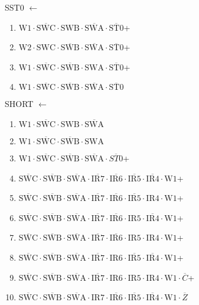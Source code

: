 \documentclass[UTF8]{ctexart}
\begin{document}
\noindent SST0 $\leftarrow$
\begin{enumerate}[\indent\indent]
	\item $\text{W1} \cdot \overline{\text{SWC}} \cdot \text{SWB} \cdot \overline{\text{SWA}} \cdot \overline{\text{ST0}}$+
	\item $\text{W2} \cdot \text{SWC} \cdot \overline{\text{SWB}} \cdot \overline{\text{SWA}} \cdot \overline{\text{ST0}}$+
	\item $\text{W1} \cdot \overline{\text{SWC}} \cdot \overline{\text{SWB}} \cdot \text{SWA} \cdot \overline{\text{ST0}}$+
	\item $\text{W1} \cdot \overline{\text{SWC}} \cdot \overline{\text{SWB}} \cdot \overline{\text{SWA}} \cdot \overline{\text{ST0}}$
\end{enumerate}
\noindent SHORT $\leftarrow$
\begin{enumerate}[\indent\indent]
	\item $\text{W1} \cdot \overline{\text{SWC}} \cdot \text{SWB} \cdot \overline{\text{SWA}}$
	\item $\text{W1} \cdot \overline{\text{SWC}} \cdot \overline{\text{SWB}} \cdot \text{SWA}$
	\item $\text{W1} \cdot \overline{\text{SWC}} \cdot \overline{\text{SWB}} \cdot \overline{\text{SWA}} \cdot \overline{ST0}$+
	\item $\overline{\text{SWC}} \cdot\overline{\text{SWB}}\cdot \overline{\text{SWA}} \cdot \overline{\text{IR7}} \cdot \overline{\text{IR6}} \cdot \overline{\text{IR5}} \cdot \overline{\text{IR4}} \cdot \text{W1}$+
	\item $\overline{\text{SWC}} \cdot\overline{\text{SWB}}\cdot \overline{\text{SWA}} \cdot \overline{\text{IR7}} \cdot \overline{\text{IR6}} \cdot \overline{\text{IR5}} \cdot \text{IR4} \cdot \text{W1}$+
	\item $\overline{\text{SWC}} \cdot\overline{\text{SWB}}\cdot \overline{\text{SWA}} \cdot \overline{\text{IR7}} \cdot \overline{\text{IR6}} \cdot \text{IR5} \cdot \overline{\text{IR4}} \cdot \text{W1}$+
	\item $\overline{\text{SWC}} \cdot\overline{\text{SWB}}\cdot \overline{\text{SWA}} \cdot \overline{\text{IR7}} \cdot \overline{\text{IR6}} \cdot \text{IR5} \cdot \text{IR4} \cdot \text{W1}$+
	\item $\overline{\text{SWC}} \cdot\overline{\text{SWB}}\cdot \overline{\text{SWA}} \cdot \overline{\text{IR7}} \cdot \text{IR6} \cdot \overline{\text{IR5}} \cdot \overline{\text{IR4}} \cdot \text{W1}$+
	\item $\overline{\text{SWC}} \cdot\overline{\text{SWB}}\cdot \overline{\text{SWA}} \cdot \overline{\text{IR7}} \cdot \text{IR6} \cdot \text{IR5} \cdot \text{IR4} \cdot \text{W1} \cdot \overline{C}$+
	\item $\overline{\text{SWC}} \cdot\overline{\text{SWB}}\cdot \overline{\text{SWA}} \cdot \text{IR7} \cdot \overline{\text{IR6}} \cdot \overline{\text{IR5}} \cdot \overline{\text{IR4}} \cdot \text{W1} \cdot \overline{Z}$
\end{enumerate}
\end{document}
